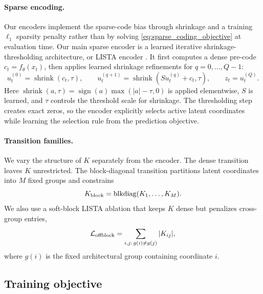 \documentclass[11pt]{article}
\newcommand{\shrink}{\operatorname{shrink}}
\newcommand{\blkdiag}{\operatorname{blkdiag}}
\theoremstyle{plain}
\theoremstyle{definition}
\begin{document}
\paragraph{Sparse encoding.} Our encoders implement the sparse-code bias through shrinkage and a training $\ell_1$ sparsity penalty rather than by solving \cref{eq:sparse_coding_objective} at evaluation time. Our main sparse encoder is a learned iterative shrinkage-thresholding architecture, or LISTA encoder \citep{gregor_learning_2010}. It first computes a dense pre-code \(c_t=f_\theta(x_t)\), then applies learned shrinkage refinements for $q=0,\ldots,Q-1$:
\begin{equation}
  u_t^{(0)}=\shrink(c_t,\tau),\qquad
  u_t^{(q+1)}=\shrink(Su_t^{(q)}+c_t,\tau),\qquad
  z_t=u_t^{(Q)}.
  \label{eq:lista}
\end{equation}
Here $\shrink(a,\tau)=\operatorname{sign}(a)\max(|a|-\tau,0)$
is applied elementwise, \(S\) is learned, and \(\tau\) controls the threshold scale for shrinkage. The thresholding step creates exact zeros, so the encoder explicitly selects active latent coordinates while learning the selection rule from the prediction objective.

\paragraph{Transition families.} We vary the structure of \(K\) separately from the encoder. The dense transition leaves \(K\) unrestricted. The block-diagonal transition partitions latent coordinates into \(M\) fixed groups and constrains
\begin{equation}
  K_{\rm block}=\blkdiag(K_1,\ldots,K_M).
  \label{eq:block_transition}
\end{equation}
We also use a soft-block LISTA ablation that keeps \(K\) dense but penalizes cross-group entries,
\begin{equation}
  \mathcal{L}_{\rm offblock}
  =
  \sum_{i,j:\,g(i)\ne g(j)} |K_{ij}|,
  \label{eq:offblock_penalty}
\end{equation}
where \(g(i)\) is the fixed architectural group containing coordinate \(i\).

\subsection{Training objective}
\label{sec:method_training}
\end{document}
